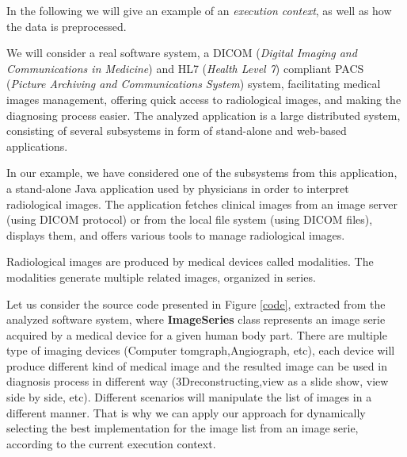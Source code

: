 In the following we will give an example of an \emph{execution context}, as well as how the data is preprocessed.

We will consider a real software system,  a DICOM (\emph{Digital Imaging and Communications in Medicine}) \cite{dicom} and HL7 (\emph{Health Level 7}) \cite{hl7} compliant PACS (\emph{Picture Archiving and Communications System}) system, facilitating medical images management, offering  quick access to radiological images, and making the diagnosing process easier. The analyzed application is a large distributed system, consisting of several subsystems in form of stand-alone and web-based applications.

In our example, we have considered one of the subsystems from this application, a stand-alone Java application used by physicians in order to interpret radiological images. The application fetches clinical images from an image server (using DICOM protocol) or from the local file system (using DICOM files), displays them, and offers various tools to manage radiological images.

Radiological images are produced by medical devices called modalities. The modalities generate multiple related images, organized in series.

Let us consider the source code presented in Figure \ref{code}, extracted from the analyzed software system, where \textbf{ImageSeries} class represents an image serie acquired by a medical device for a given human body part. There are multiple type of imaging devices (Computer tomgraph,Angiograph, etc), each device will produce different kind of medical image and the resulted image can be used in diagnosis process in different way (3Dreconstructing,view as a slide show, view side by side, etc). Different scenarios will manipulate the list of images in a different manner. That is why we can apply our approach for dynamically selecting the best implementation for the image list from an image serie, according to the current execution context.

